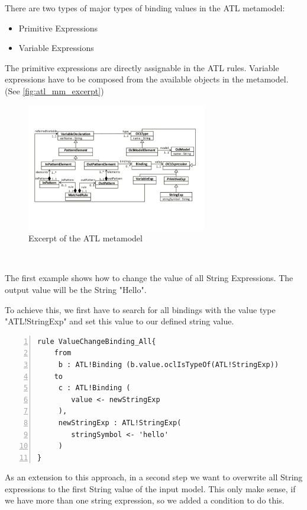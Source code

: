 \documentclass{llncs}
\begin{document}
There are two types of major types of binding values in the ATL metamodel:

\begin{itemize}
	\item Primitive Expressions
	\item Variable Expressions
\end{itemize}

The primitive expressions are directly assignable in the ATL rules. Variable expressions have to be composed from the available objects in the metamodel. (See \ref{fig:atl_mm_excerpt})

\begin{figure}
	\centering
	\includegraphics[width=0.7\textwidth,natwidth=610,natheight=642]{figures/ATL_Metamodel_Excerpt}
	\caption{Excerpt of the ATL metamodel}
	\label{fig:atl_metamodel_excerpt}
\end{figure}~

The first example shows how to change the value of all String Expressions. The output value will be the String "Hello".

To achieve this, we first have to search for all bindings with the value type "ATL!StringExp" and set this value to our defined string value.

\begin{lstlisting}[language=ATL, numbers=left,xleftmargin=5.0ex, caption=ValueChangeBinding-Definition., label=lst:valuechangebinding]
rule ValueChangeBinding_All{
	from
	 b : ATL!Binding (b.value.oclIsTypeOf(ATL!StringExp))
	to
	 c : ATL!Binding (
	 	value <- newStringExp
	 ),
	 newStringExp : ATL!StringExp(
	 	stringSymbol <- 'hello'	
	 )
}
\end{lstlisting}

As an extension to this approach, in a second step we want to overwrite all String expressions to the first String value of the input model. This only make sense, if we have more than one string expression, so we added a condition to do this.
\end{document}
